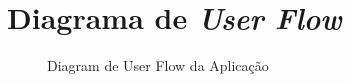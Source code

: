 
\chapter{Diagrama de \textit{User Flow}} %

\label{app:userflowchart}

\begin{figure}
    \caption{Diagram de User Flow da Aplicação}
    \label{fig:userflowchart}
\end{figure}